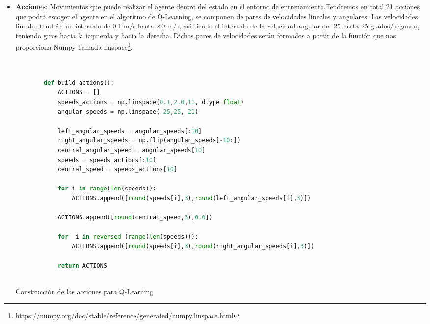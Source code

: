 \begin{itemize}
    \item \textbf{Acciones}: Movimientos que puede realizar el agente dentro del estado en el entorno de entrenamiento.Tendremos en total 21 acciones que podrá escoger el agente en el algoritmo de Q-Learning, se componen de pares de velocidades lineales y angulares. Las velocidades lineales
    tendrán un intervalo de 0.1 m/s hasta 2.0 m/s, así siendo el intervalo de la velocidad angular de -25 hasta 25 grados/segundo, teniendo giros hacia la izquierda y hacia la derecha. Dichos pares
    de velocidades serán formados a partir de la función que nos proporciona Numpy llamada linspace\footnote{\url{https://numpy.org/doc/stable/reference/generated/numpy.linspace.html}}. \newline
  
    \begin{code}[H]
      \begin{lstlisting}[language=Python]
  
        
        def build_actions():
            ACTIONS = []
            speeds_actions = np.linspace(0.1,2.0,11, dtype=float)
            angular_speeds = np.linspace(-25,25, 21)
        
            left_angular_speeds = angular_speeds[:10]
            right_angular_speeds = np.flip(angular_speeds[-10:])
            central_angular_speed = angular_speeds[10]
            speeds = speeds_actions[:10]
            central_speed = speeds_actions[10]
        
            for i in range(len(speeds)):
                ACTIONS.append([round(speeds[i],3),round(left_angular_speeds[i],3)])
        
            ACTIONS.append([round(central_speed,3),0.0])
        
            for  i in reversed (range(len(speeds))):
                ACTIONS.append([round(speeds[i],3),round(right_angular_speeds[i],3)])
  
            return ACTIONS
       
      \end{lstlisting}
      \caption[Construcción de las acciones para Q-Learning]{Construcción de las acciones para Q-Learning}
      \label{cod:Acciones}
      \end{code}
      

\end{itemize}
